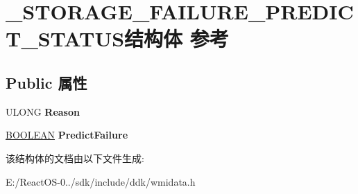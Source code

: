 \hypertarget{struct___s_t_o_r_a_g_e___f_a_i_l_u_r_e___p_r_e_d_i_c_t___s_t_a_t_u_s}{}\section{\+\_\+\+S\+T\+O\+R\+A\+G\+E\+\_\+\+F\+A\+I\+L\+U\+R\+E\+\_\+\+P\+R\+E\+D\+I\+C\+T\+\_\+\+S\+T\+A\+T\+U\+S结构体 参考}
\label{struct___s_t_o_r_a_g_e___f_a_i_l_u_r_e___p_r_e_d_i_c_t___s_t_a_t_u_s}
\subsection*{Public 属性}
\begin{DoxyCompactItemize}
\item 
\mbox{\label{struct___s_t_o_r_a_g_e___f_a_i_l_u_r_e___p_r_e_d_i_c_t___s_t_a_t_u_s_aa43fc9180ecc5c0d2edc9ea567bae042}} 
U\+L\+O\+NG {\bfseries Reason}
\item 
\mbox{\label{struct___s_t_o_r_a_g_e___f_a_i_l_u_r_e___p_r_e_d_i_c_t___s_t_a_t_u_s_a46ef15aded67aba02532331fbd8ae79f}} 
\hyperlink{_processor_bind_8h_a112e3146cb38b6ee95e64d85842e380a}{B\+O\+O\+L\+E\+AN} {\bfseries Predict\+Failure}
\end{DoxyCompactItemize}


该结构体的文档由以下文件生成\+:\begin{DoxyCompactItemize}
\item 
E\+:/\+React\+O\+S-\/0../sdk/include/ddk/wmidata.\+h\end{DoxyCompactItemize}
